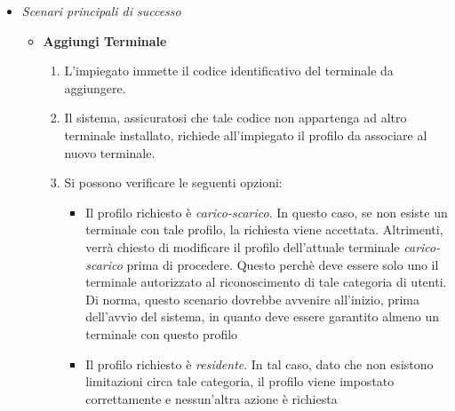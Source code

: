 \documentclass[12pt, letterpaper]{article}
\begin{document}
\begin{itemize}
    \item \emph{Scenari principali di successo}
    \begin{itemize}
        \item \textbf{Aggiungi Terminale}
        \begin{enumerate}
            \item L'impiegato immette il codice 
            identificativo del terminale da 
            aggiungere.
            \item Il sistema, assicuratosi che tale 
            codice non appartenga ad altro terminale 
            installato, richiede all'impiegato il 
            profilo da associare al nuovo terminale.
            \item Si possono verificare le seguenti 
            opzioni:
            \begin{itemize}
                \item Il profilo richiesto è 
                \emph{carico-scarico}. In questo 
                caso, se non esiste un terminale 
                con tale profilo, la richiesta 
                viene accettata. Altrimenti, verrà 
                chiesto di modificare il profilo 
                dell'attuale terminale 
                \emph{carico-scarico} prima di 
                procedere. Questo perchè deve 
                essere solo uno il terminale 
                autorizzato al riconoscimento di 
                tale categoria di utenti. Di norma, 
                questo scenario dovrebbe avvenire 
                all'inizio, prima dell'avvio del 
                sistema, in quanto deve essere 
                garantito almeno un terminale con 
                questo profilo
                \item Il profilo richiesto è 
                \emph{residente}. In tal caso, dato 
                che non esistono limitazioni circa 
                tale categoria, il profilo viene 
                impostato correttamente e 
                nessun'altra azione è richiesta
            \end{itemize}
        \end{enumerate}
    \end{itemize}


\end{itemize}
\end{document}
